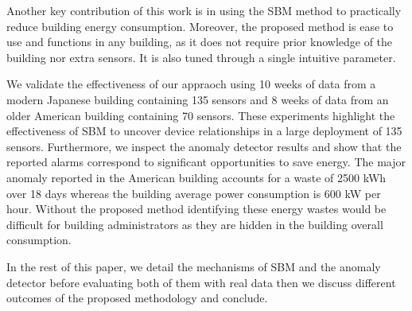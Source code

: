 Another key contribution of this work is in using the SBM method to practically reduce building energy consumption.
Moreover, the proposed method is ease to use and functions in any building, as it does not require prior knowledge of the
 building nor extra sensors.  It is also tuned through a single intuitive parameter.  %

We validate the effectiveness of our appraoch using 10 weeks of data from a modern Japanese building containing 135 sensors and 
8 weeks of data from an older American building containing 70 sensors.
These experiments highlight the effectiveness of SBM to uncover device relationships in a large deployment of 135 sensors.
Furthermore, we inspect the anomaly detector results and show that the reported alarms correspond to significant opportunities to save energy.
The major anomaly reported in the American building accounts for a waste of 2500 kWh over 18 days whereas the building average power consumption is 600 kW per hour.
Without the proposed method identifying these energy wastes would be difficult for building administrators as they are hidden in the building overall consumption.

In the rest of this paper, we detail the mechanisms of SBM and the anomaly detector before evaluating both of them with real data then we discuss different outcomes of the proposed methodology and conclude.
